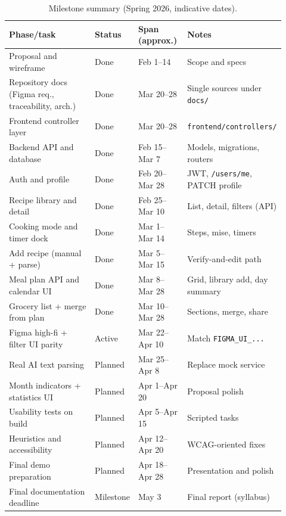 \documentclass[conference]{IEEEtran}
\begin{document}
\begin{table}[!htbp]
\centering
\caption{Milestone summary (Spring 2026, indicative dates).}
\label{tab:gantt}
\begin{tabular}{|@{}>{\raggedright\arraybackslash}p{0.34\linewidth}|>{\raggedright\arraybackslash}p{0.12\linewidth}|>{\raggedright\arraybackslash}p{0.18\linewidth}|>{\raggedright\arraybackslash}p{0.28\linewidth}@{}|}
\hline
\textbf{Phase/task} & \textbf{Status} & \textbf{Span (approx.)} & \textbf{Notes} \\
\hline
Proposal and wireframe & Done & Feb 1--14 & Scope and specs \\
Repository docs (Figma req., traceability, arch.) & Done & Mar 20--28 & Single sources under \texttt{docs/} \\
Frontend controller layer & Done & Mar 20--28 & \texttt{frontend/controllers/} \\
Backend API and database & Done & Feb 15--Mar 7 & Models, migrations, routers \\
Auth and profile & Done & Feb 20--Mar 28 & JWT, \texttt{/users/me}, PATCH profile \\
Recipe library and detail & Done & Feb 25--Mar 10 & List, detail, filters (API) \\
Cooking mode and timer dock & Done & Mar 1--Mar 14 & Steps, mise, timers \\
Add recipe (manual + parse) & Done & Mar 5--Mar 15 & Verify-and-edit path \\
Meal plan API and calendar UI & Done & Mar 8--Mar 28 & Grid, library add, day summary \\
Grocery list + merge from plan & Done & Mar 10--Mar 28 & Sections, merge, share \\
\hline
\addlinespace
\hline
Figma high-fi + filter UI parity & Active & Mar 22--Apr 10 & Match \texttt{FIGMA\_UI\_...} \\
Real AI text parsing & Planned & Mar 25--Apr 8 & Replace mock service \\
Month indicators + statistics UI & Planned & Apr 1--Apr 20 & Proposal polish \\
\hline
\addlinespace
\hline
Usability tests on build & Planned & Apr 5--Apr 15 & Scripted tasks \\
Heuristics and accessibility & Planned & Apr 12--Apr 20 & WCAG-oriented fixes~\cite{wcag21} \\
Final demo preparation & Planned & Apr 18--Apr 28 & Presentation and polish \\
Final documentation deadline & Milestone & May 3 & Final report (syllabus) \\
\hline
\end{tabular}
\end{table}
\end{document}
